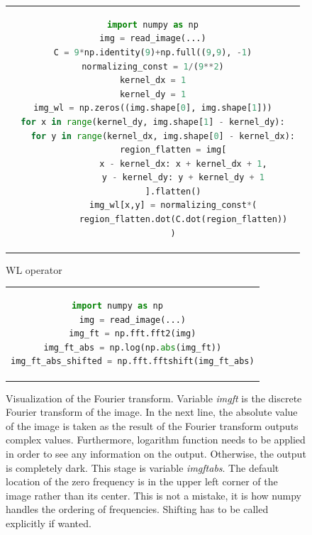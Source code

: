 \begin{figure}[htpb]
	\begin{tabular}{c}
	\begin{lstlisting}[language=Python]
import numpy as np
img = read_image(...)
C = 9*np.identity(9)+np.full((9,9), -1)
normalizing_const = 1/(9**2)
kernel_dx = 1
kernel_dy = 1
img_wl = np.zeros((img.shape[0], img.shape[1]))
for x in range(kernel_dy, img.shape[1] - kernel_dy):
	for y in range(kernel_dx, img.shape[0] - kernel_dx):
		region_flatten = img[
			x - kernel_dx: x + kernel_dx + 1,
			y - kernel_dy: y + kernel_dy + 1
		].flatten()
		img_wl[x,y] = normalizing_const*(
			region_flatten.dot(C.dot(region_flatten))
		)
	\end{lstlisting}
	\end{tabular}
	\caption[Example listing]{WL operator}
\label{code:wl}
\end{figure}

\begin{figure}[htpb]
	\begin{tabular}{c}
	\begin{lstlisting}[language=Python]
import numpy as np		
img = read_image(...)
img_ft = np.fft.fft2(img)
img_ft_abs = np.log(np.abs(img_ft))
img_ft_abs_shifted = np.fft.fftshift(img_ft_abs)
	\end{lstlisting}
	\end{tabular}
	\caption[Example listing]{Visualization of the Fourier transform. Variable \emph{img\textunderscore ft} is the discrete Fourier transform of the image. In the next line, the absolute value of the image is taken as the result of the Fourier transform outputs complex values. Furthermore, logarithm function needs to be applied in order to see any information on the output. Otherwise, the output is completely dark. This stage is variable \emph{img\textunderscore ft\textunderscore abs}. The default location of the zero frequency is in the upper left corner of the image rather than its center. This is not a mistake, it is how numpy handles the ordering of frequencies. Shifting has to be called explicitly if wanted.}
\label{code:fft-shift}
\end{figure}

